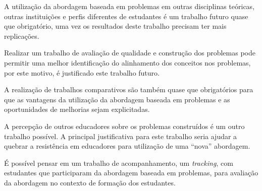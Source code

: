 A utilização da abordagem baseada em problemas em
outras disciplinas teóricas, outras instituições
e perfis diferentes de estudantes
é um trabalho futuro quase que obrigatório, uma vez
os resultados deste trabalho precisam ter mais
replicações.

Realizar um trabalho de avaliação de qualidade e
construção dos problemas pode permitir uma melhor
identificação do alinhamento dos conceitos nos
problemas, por este motivo, é justificado este
trabalho futuro.

A realização de trabalhos comparativos são também quase
que obrigatórios para que as vantagens da utilização
da abordagem baseada em problemas e as oportunidades
de melhorias sejam explicitadas.

A percepção de outros educadores sobre os problemas
construídos é um outro trabalho possível.
A principal justificativa para este trabalho seria
ajudar a quebrar a resistência em educadores para
utilização de uma ``nova'' abordagem.

É possível pensar em um trabalho de acompanhamento,
um \textit{tracking}, com estudantes que participaram
da abordagem baseada em problemas, para avaliação
da abordagem no contexto de formação dos estudantes.



